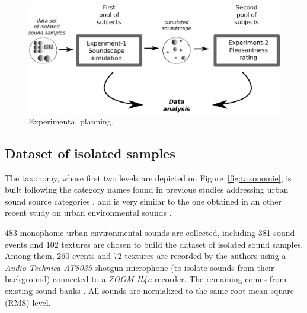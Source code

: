\documentclass[twoside,twocolumn]{article}
\begin{document}
\begin{figure}[t]
\begin{center}
\includegraphics[width=.4\paperwidth]{../gfx/5.eps}
\caption{\label{fig:expLan} Experimental planning.}
\end{center}
\end{figure}

\subsection{Dataset of isolated samples}

The taxonomy, whose first two levels are depicted on Figure~\ref{fig:taxonomie}, is built following the category names found in previous studies addressing urban sound source categories \cite{maffiolo_caracterisation_1999,dubois2006cognitive,guastavino_categorization_2007, guastavino_ideal_2006, niessen_categories_2010, brown_towards_2011}, and is very similar to the one obtained in an other recent study on urban environmental sounds \cite{Salamon14}. 

483 monophonic urban environmental sounds are collected, including 381 sound events and 102 textures are chosen to build the dataset of isolated sound samples. Among them, 260 events and 72 textures are recorded by the authors using a \textit{Audio Technica AT8035} shotgun microphone (to isolate sounds from their background) connected to a \textit{ZOOM H4n} recorder. The remaining comes from existing sound banks . All sounds are normalized to the same root mean square (RMS) level.
\end{document}
